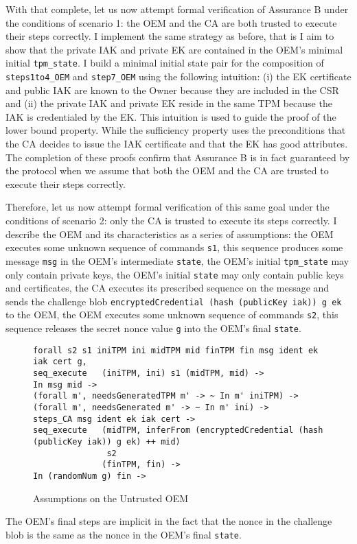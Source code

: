With that complete, let us now attempt formal verification of Assurance B under the conditions of scenario 1: the OEM and the CA are both trusted to execute their steps correctly. I implement the same strategy as before, that is I aim to show that the private IAK and private EK are contained in the OEM's minimal initial \verb|tpm_state|. I build a minimal initial state pair for the composition of \verb|steps1to4_OEM| and \verb|step7_OEM| using the following intuition: (i) the EK certificate and public IAK are known to the Owner because they are included in the CSR and (ii) the private IAK and private EK reside in the same TPM because the IAK is credentialed by the EK. This intuition is used to guide the proof of the lower bound property. While the sufficiency property uses the preconditions that the CA decides to issue the IAK certificate and that the EK has good attributes. The completion of these proofs confirm that Assurance B is in fact guaranteed by the protocol when we assume that both the OEM and the CA are trusted to execute their steps correctly.

Therefore, let us now attempt formal verification of this same goal under the conditions of scenario 2: only the CA is trusted to execute its steps correctly. 
I describe the OEM and its characteristics as a series of assumptions: the OEM executes some unknown sequence of commands \verb|s1|, this sequence produces some message \verb|msg| in the OEM's intermediate \verb|state|, the OEM's initial \verb|tpm_state| may only contain private keys, the OEM's initial \verb|state| may only contain public keys and certificates, the CA executes its prescribed sequence on the message and sends the challenge blob \verb|encryptedCredential (hash (publicKey iak)) g ek| to the OEM, the OEM executes some unknown sequence of commands \verb|s2|, this sequence releases the secret nonce value \verb|g| into the OEM's final \verb|state|. 
\begin{figure}[h]
\begin{lstlisting}[language=Coq]
forall s2 s1 iniTPM ini midTPM mid finTPM fin msg ident ek iak cert g,
seq_execute   (iniTPM, ini) s1 (midTPM, mid) -> 
In msg mid ->
(forall m', needsGeneratedTPM m' -> ~ In m' iniTPM) ->
(forall m', needsGenerated m' -> ~ In m' ini) ->
steps_CA msg ident ek iak cert ->
seq_execute   (midTPM, inferFrom (encryptedCredential (hash (publicKey iak)) g ek) ++ mid) 
               s2 
              (finTPM, fin) ->
In (randomNum g) fin ->
\end{lstlisting}
\caption{Assumptions on the Untrusted OEM}
\label{fig:oem_assumptions}
\end{figure}
The OEM's final steps are implicit in the fact that the nonce in the challenge blob is the same as the nonce in the OEM's final \verb|state|. 


